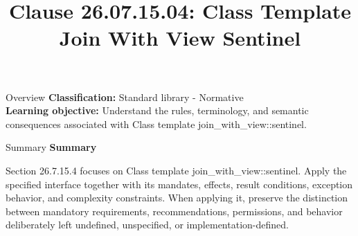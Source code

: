 \documentclass[10pt,letterpaper]{article}
\title{Clause 26.07.15.04: Class Template Join With View Sentinel}
\author{}
\date{}
\begin{document}
\maketitle
\begin{CornellOverviewBox}{Overview}
\textbf{Classification:} Standard library - Normative\\[2pt]
\textbf{Learning objective:} Understand the rules, terminology, and semantic consequences associated with Class template join\_with\_view::sentinel.
\end{CornellOverviewBox}\begin{CornellSummaryBox}{Summary}
{\sffamily\bfseries\color{Accent} Summary}\par\vspace{3pt}Section 26.7.15.4 focuses on Class template join\_with\_view::sentinel. Apply the specified interface together with its mandates, effects, result conditions, exception behavior, and complexity constraints. When applying it, preserve the distinction between mandatory requirements, recommendations, permissions, and behavior deliberately left undefined, unspecified, or implementation-defined.
\end{CornellSummaryBox}
\end{document}

